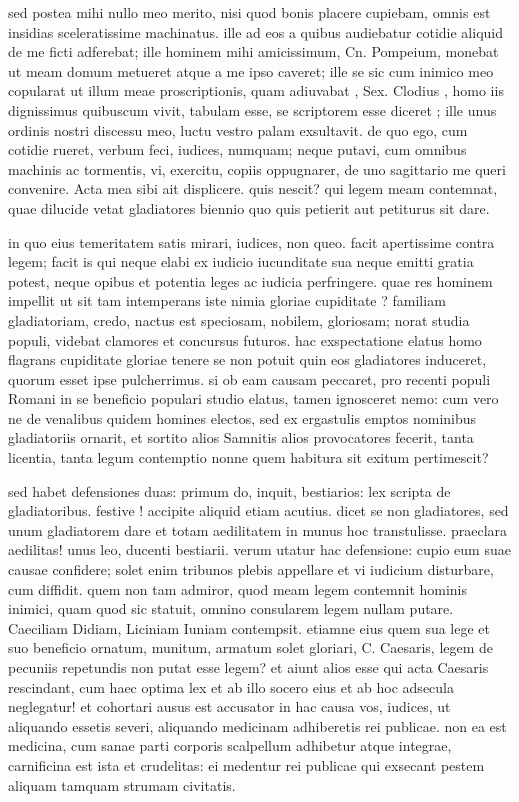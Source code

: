  sed postea mihi nullo meo merito, nisi quod bonis placere cupiebam, omnis est insidias sceleratissime machinatus. ille ad eos a quibus audiebatur cotidie aliquid de me ficti adferebat; ille hominem mihi amicissimum, Cn. Pompeium, monebat ut meam domum metueret atque a me ipso caveret; ille se sic cum inimico meo copularat ut illum meae proscriptionis, quam adiuvabat , Sex. Clodius , homo iis dignissimus quibuscum vivit, tabulam esse, se scriptorem esse diceret ; ille unus ordinis nostri discessu meo, luctu vestro palam exsultavit. de quo ego, cum cotidie rueret, verbum feci, iudices, numquam; neque putavi, cum omnibus machinis ac tormentis, vi, exercitu, copiis oppugnarer, de uno sagittario me queri convenire. Acta mea sibi ait displicere. quis nescit? qui legem meam contemnat, quae dilucide vetat gladiatores biennio quo quis petierit aut petiturus sit dare.

 in quo eius temeritatem satis mirari, iudices, non queo. facit apertissime contra legem; facit is qui neque elabi ex iudicio iucunditate sua neque emitti gratia potest, neque opibus et potentia leges ac iudicia perfringere. quae res hominem impellit ut sit tam intemperans iste nimia gloriae cupiditate ? familiam gladiatoriam, credo, nactus est speciosam, nobilem, gloriosam; norat studia populi, videbat clamores et concursus futuros. hac exspectatione elatus homo flagrans cupiditate gloriae tenere se non potuit quin eos gladiatores induceret, quorum esset ipse pulcherrimus. si ob eam causam peccaret, pro recenti populi Romani in se beneficio populari studio elatus, tamen ignosceret nemo: cum vero ne de venalibus quidem homines electos, sed ex ergastulis emptos nominibus gladiatoriis ornarit, et sortito alios Samnitis alios provocatores fecerit, tanta licentia, tanta legum contemptio nonne quem habitura sit exitum pertimescit?

 sed habet defensiones duas: primum do, inquit, bestiarios: lex scripta de gladiatoribus. festive ! accipite aliquid etiam acutius. dicet se non gladiatores, sed unum gladiatorem dare et totam aedilitatem in munus hoc transtulisse. praeclara aedilitas! unus leo, ducenti bestiarii. verum utatur hac defensione: cupio eum suae causae confidere; solet enim tribunos plebis appellare et vi iudicium disturbare, cum diffidit. quem non tam admiror, quod meam legem contemnit hominis inimici, quam quod sic statuit, omnino consularem legem nullam putare. Caeciliam Didiam, Liciniam Iuniam contempsit. etiamne eius quem sua lege et suo beneficio ornatum, munitum, armatum solet gloriari, C. Caesaris, legem de pecuniis repetundis non putat esse legem? et aiunt alios esse qui acta Caesaris rescindant, cum haec optima lex et ab illo socero eius et ab hoc adsecula neglegatur! et cohortari ausus est accusator in hac causa vos, iudices, ut aliquando essetis severi, aliquando medicinam adhiberetis rei publicae. non ea est medicina, cum sanae parti corporis scalpellum adhibetur atque integrae, carnificina est ista et crudelitas: ei medentur rei publicae qui exsecant pestem aliquam tamquam strumam civitatis.

